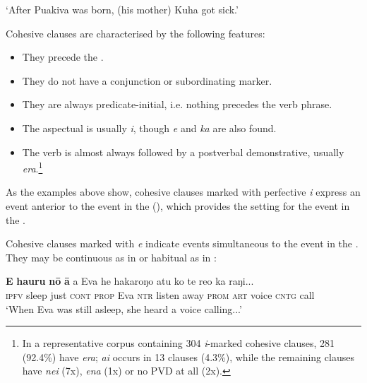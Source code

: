 \glt
‘After Puakiva was born, (his mother) Kuha got sick.’ \textstyleExampleref{[R229.001]} 
\z

Cohesive clauses are characterised by the following features:

\begin{itemize}
\item 
They precede the .

\item 
They do not have a conjunction or subordinating marker.

\item 
They are always predicate-initial, i.e. nothing precedes the verb phrase.

\item 
The aspectual is usually \textit{i}, though \textit{e} and \textit{ka} are also found.

\item 
The verb is almost always followed by a postverbal demonstrative, usually \textit{era}.\footnote{\label{fn:529}In a representative corpus containing 304 \textit{i}{}-marked cohesive clauses, 281 (92.4\%) have \textit{era}; \textit{ai} occurs in 13 clauses (4.3\%), while the remaining clauses have \textit{nei} (7x), \textit{ena} (1x) or no PVD at all (2x).} 

\end{itemize}

As the examples above show, cohesive clauses marked with perfective \textit{i} express an event anterior to the event in the  (), which provides the setting for the event in the .

Cohesive clauses marked with  \textit{e} indicate events simultaneous to the event in the . They may be continuous as in  or habitual as in :

\ea\label{ex:11.213}
\gll \textbf{E} \textbf{ha{\ꞌ}uru} \textbf{nō} \textbf{{\ꞌ}ā} a Eva he hakaroŋo atu ko te re{\ꞌ}o ka raŋi... \\
\textsc{ipfv} sleep just \textsc{cont} \textsc{prop} Eva \textsc{ntr} listen away \textsc{prom} \textsc{art} voice \textsc{cntg} call \\

\glt 
‘When Eva was still asleep, she heard a voice calling...’ \textstyleExampleref{[R210.080]} 
\z


